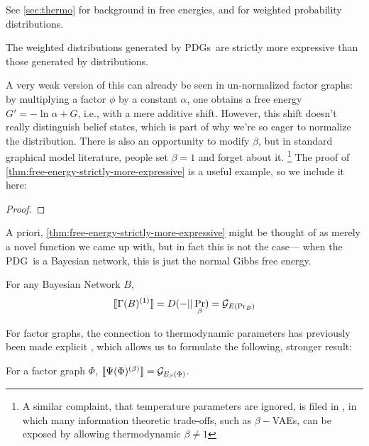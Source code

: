 \documentclass{article}
\newcommand\changed[1]{{\color{note-fg} #1}}
\newcommand\MaxEnt{{\overset{\uparrow}{\mathbf H}}}
\newcommand{\MN}{PDG}
\newcommand{\MNs}{\MN s}
\begin{document}
	See \ref{sec:thermo} for background in free energies, and \cite{} for weighted probability distributions.
	
	\begin{theorem}\label{thm:free-energy-strictly-more-expressive}
	 	The weighted distributions generated by \MNs\ are strictly more expressive than those generated by distributions.
	\end{theorem}
	
	A very weak version of this can already be seen in un-normalized factor graphs: by multiplying a factor $\phi$ by a constant $\alpha$, one obtains a free energy $G' = - \ln \alpha + G$, i.e., with a mere additive shift. However, this shift doesn't really distinguish belief states, which is part of why we're so eager to normalize the distribution.
	There is also an opportunity to modify $\beta$, but in standard graphical model literature, people set $\beta = 1$ and forget about it.%
		\footnote{\changed{A similar complaint, that temperature parameters are ignored, is filed in \cite{fixing-a-broken-elbo}, in which many information theoretic trade-offs, such as $\beta-$VAEs, can be exposed by allowing thermodynamic $\beta \neq 1$}}
	The proof of \cref{thm:free-energy-strictly-more-expressive} is a useful example, so we include it here:

	\begin{proof}
		\todo{case where $\bbr{M}_\MaxEnt = \bbr{M'}_\MaxEnt$ but $\bbr{M} \neq \bbr{M'}$}
		
		
	\end{proof}

	A priori, \cref{thm:free-energy-strictly-more-expressive} might be thought of as merely a novel function we came up with, but in fact this is not the case--- when the \MN\ is a Bayesian network, this is just the normal Gibbs free energy.

	\begin{conj}
		For any Bayesian Network $B$, 
		$$\llbracket\Gamma(B)^{(1)}\rrbracket = D(- || \Pr_\beta) = \mathcal G_{E(\Pr_B)}$$
	\end{conj}
	
	For factor graphs, the connection to thermodynamic parameters has previously been made explicit \cite{}, which allows us to formulate the following, stronger result:
	
	\begin{conj}
		For a factor graph $\Phi$, $\llbracket\Psi(\Phi)^{(\beta)}\rrbracket = \mathcal G_{E_\beta(\Phi)}$.
	\end{conj}
\end{document}
